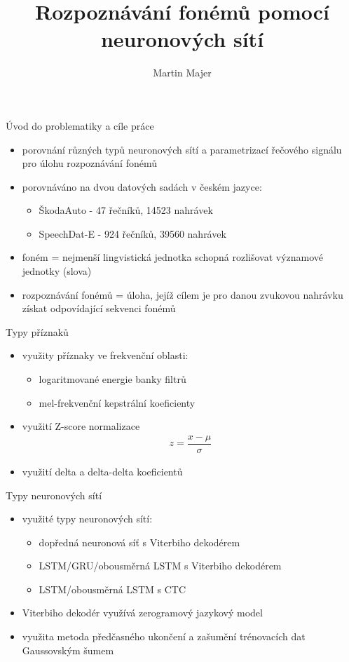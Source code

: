 \documentclass[10pt]{beamer}
\title{Rozpoznávání fonémů pomocí neuronových sítí}
\author{Martin Majer}
\date{}
\institute{Katedra kybernetiky\\Fakulta aplikovaných věd\\ Západočeská univerzita v Plzni}
\begin{document}
\maketitle

\begin{frame}{Úvod do problematiky a cíle práce}
	\begin{itemize}
		\item porovnání různých typů neuronových sítí a parametrizací řečového signálu pro úlohu rozpoznávání fonémů		
		\item porovnáváno na dvou datových sadách v českém jazyce:
			\begin{itemize}
				\item ŠkodaAuto - 47 řečníků, 14523 nahrávek
				\item SpeechDat-E - 924 řečníků, 39560 nahrávek
			\end{itemize}
		\item foném = nejmenší lingvistická jednotka schopná rozlišovat významové jednotky (slova)
		\item rozpoznávání fonémů = úloha, jejíž cílem je pro danou zvukovou nahrávku získat odpovídající sekvenci fonémů
	\end{itemize}
\end{frame}

\begin{frame}{Typy příznaků}
	\begin{itemize}
		\item využity příznaky ve frekvenční oblasti:
			\begin{itemize}
				\item logaritmované energie banky filtrů
				\item mel-frekvenční kepstrální koeficienty
			\end{itemize}
		\item využití Z-score normalizace
			\begin{align*}
				z = \dfrac{x - \mu}{\sigma}
			\end{align*}
		\item využití delta a delta-delta koeficientů
	\end{itemize}
\end{frame}

\begin{frame}{Typy neuronových sítí}
	\begin{itemize}
		\item využité typy neuronových sítí:
			\begin{itemize}
				\item dopředná neuronová síť s Viterbiho dekodérem
				\item LSTM/GRU/obousměrná LSTM s Viterbiho dekodérem
				\item LSTM/obousměrná LSTM s CTC
			\end{itemize}
		\item Viterbiho dekodér využívá zerogramový jazykový model
		\item využita metoda předčasného ukončení a zašumění trénovacích dat Gaussovským šumem
	\end{itemize}
\end{frame}
\end{document}
